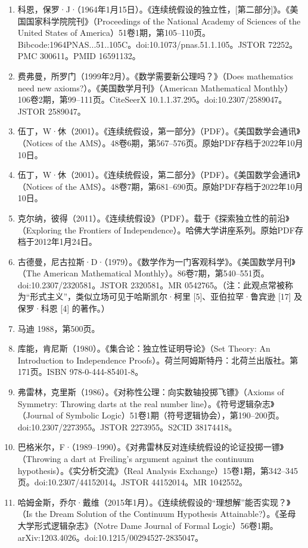 \begin{enumerate}
\item 科恩，保罗·J·（1964年1月15日）。《连续统假设的独立性，[第二部分]》。《美国国家科学院院刊》（Proceedings of the National Academy of Sciences of the United States of America）51卷1期，第105–110页。Bibcode:1964PNAS...51..105C。doi:10.1073/pnas.51.1.105。JSTOR 72252。PMC 300611。PMID 16591132。
\item 费弗曼，所罗门（1999年2月）。《数学需要新公理吗？》（Does mathematics need new axioms?）。《美国数学月刊》（American Mathematical Monthly）106卷2期，第99–111页。CiteSeerX 10.1.1.37.295。doi:10.2307/2589047。JSTOR 2589047。
\item 伍丁，W·休（2001）。《连续统假设，第一部分》（PDF）。《美国数学会通讯》（Notices of the AMS）。48卷6期，第567–576页。原始PDF存档于2022年10月10日。
\item 伍丁，W·休（2001）。《连续统假设，第二部分》（PDF）。《美国数学会通讯》（Notices of the AMS）。48卷7期，第681–690页。原始PDF存档于2022年10月10日。
\item 克尔纳，彼得（2011）。《连续统假设》（PDF）。载于《探索独立性的前沿》（Exploring the Frontiers of Independence）。哈佛大学讲座系列。原始PDF存档于2012年1月24日。
\item 古德曼，尼古拉斯·D·（1979）。《数学作为一门客观科学》。《美国数学月刊》（The American Mathematical Monthly）。86卷7期，第540–551页。doi:10.2307/2320581。JSTOR 2320581。MR 0542765。（注：此观点常被称为“形式主义”，类似立场可见于哈斯凯尔·柯里 [5]、亚伯拉罕·鲁宾逊 [17] 及保罗·科恩 [4] 的著作。）
\item 马迪 1988，第500页。
\item 库能，肯尼斯（1980）。《集合论：独立性证明导论》（Set Theory: An Introduction to Independence Proofs）。荷兰阿姆斯特丹：北荷兰出版社。第171页。ISBN 978-0-444-85401-8。
\item 弗雷林，克里斯（1986）。《对称性公理：向实数轴投掷飞镖》（Axioms of Symmetry: Throwing darts at the real number line）。《符号逻辑杂志》（Journal of Symbolic Logic）51卷1期（符号逻辑协会），第190–200页。doi:10.2307/2273955。JSTOR 2273955。S2CID 38174418。
\item 巴格米尔，F·（1989–1990）。《对弗雷林反对连续统假设的论证投掷一镖》（Throwing a dart at Freiling's argument against the continuum hypothesis）。《实分析交流》（Real Analysis Exchange）15卷1期，第342–345页。doi:10.2307/44152014。JSTOR 44152014。MR 1042552。
\item 哈姆金斯，乔尔·戴维（2015年1月）。《连续统假设的“理想解”能否实现？》（Is the Dream Solution of the Continuum Hypothesis Attainable?）。《圣母大学形式逻辑杂志》（Notre Dame Journal of Formal Logic）56卷1期。arXiv:1203.4026。doi:10.1215/00294527-2835047。

\end{enumerate}
